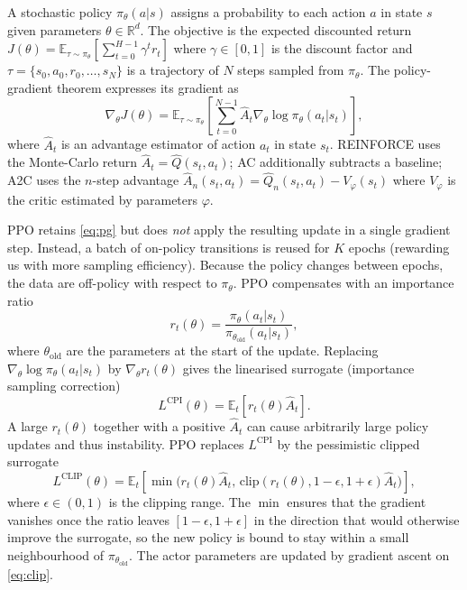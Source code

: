 \documentclass{article}
\theoremstyle{plain}
\theoremstyle{definition}
\theoremstyle{remark}
\begin{document}
A stochastic policy $\pi_\theta(a|s)$ assigns a probability to each action $a$ in state $s$ given parameters $\theta\in\mathbb{R}^{d}$. The objective is the expected discounted return $J(\theta)=\mathbb{E}_{\tau\sim\pi_\theta}\!\left[\sum_{t=0}^{H-1}\gamma^t r_t\right]$ where $\gamma\in[0,1]$ is the discount factor and $\tau=\{s_0,a_0,r_0,\dots,s_N\}$ is a trajectory of $N$ steps sampled from $\pi_\theta$. The policy-gradient theorem expresses its gradient as
\begin{equation}
    \nabla_\theta J(\theta) = \mathbb{E}_{\tau\sim\pi_\theta}\!\left[\sum_{t=0}^{N-1} \hat A_t \nabla_\theta \log\pi_\theta(a_t|s_t)\right],
    \label{eq:pg}
\end{equation}
where $\hat A_t$ is an advantage estimator of action $a_t$ in state $s_t$. REINFORCE uses the Monte-Carlo return $\hat A_t=\hat Q(s_t,a_t)$; AC additionally subtracts a baseline; A2C uses the $n$-step advantage $\hat A_n(s_t,a_t)=\hat Q_n(s_t,a_t)-V_\varphi(s_t)$ where $V_\varphi$ is the critic estimated by parameters $\varphi$.

PPO retains \cref{eq:pg} but does \emph{not} apply the resulting update in a single gradient step. Instead, a batch of on-policy transitions is reused for $K$ epochs (rewarding us with more sampling efficiency). Because the policy changes between epochs, the data are off-policy with respect to $\pi_\theta$. PPO compensates with an importance ratio
\begin{equation}
    r_t(\theta) = \frac{\pi_\theta(a_t|s_t)}{\pi_{\theta_{\mathrm{old}}}(a_t|s_t)},
    \label{eq:ratio}
\end{equation}
where $\theta_{\mathrm{old}}$ are the parameters at the start of the update. Replacing $\nabla_\theta\log\pi_\theta(a_t|s_t)$ by $\nabla_\theta r_t(\theta)$ gives the linearised surrogate (importance sampling correction)
\begin{equation}
    L^{\mathrm{CPI}}(\theta) = \mathbb{E}_t\!\left[r_t(\theta)\hat A_t\right].
    \label{eq:cpi}
\end{equation}
A large $r_t(\theta)$ together with a positive $\hat A_t$ can cause arbitrarily large policy updates and thus instability. PPO replaces $L^{\mathrm{CPI}}$ by the pessimistic clipped surrogate
\begin{equation}
    \!L^{\mathrm{CLIP}}\!(\theta)\! =\! \mathbb{E}_t\!\left[\min\!\big(r_t(\theta)\hat A_t,\,\mathrm{clip}(r_t(\theta),1\!-\!\epsilon,1\!+\!\epsilon)\hat A_t\big)\right]\!\!,
    \label{eq:clip}
\end{equation}
where $\epsilon\in(0,1)$ is the clipping range. The $\min$ ensures that the gradient vanishes once the ratio leaves $[1-\epsilon,1+\epsilon]$ in the direction that would otherwise improve the surrogate, so the new policy is bound to stay within a small neighbourhood of $\pi_{\theta_{\mathrm{old}}}$. The actor parameters are updated by gradient ascent on \cref{eq:clip}.
\end{document}
